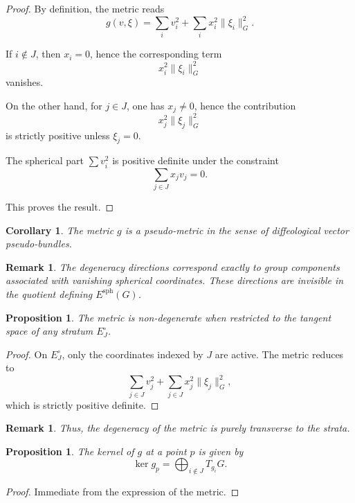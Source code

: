 \documentclass[11pt]{amsart}
\newtheorem{corollary}[theorem]{Corollary}
\newtheorem{proposition}[theorem]{Proposition}
\newtheorem{remark}[theorem]{Remark}
\begin{document}
\begin{proof}
By definition, the metric reads
\[
g(v,\xi)
=
\sum_i v_i^2
+
\sum_i x_i^2 \|\xi_i\|_G^2.
\]

If $i \notin J$, then $x_i = 0$, hence the corresponding term
\[
x_i^2 \|\xi_i\|_G^2
\]
vanishes.

On the other hand, for $j \in J$, one has $x_j \neq 0$, hence the contribution
\[
x_j^2 \|\xi_j\|_G^2
\]
is strictly positive unless $\xi_j = 0$.

The spherical part $\sum v_i^2$ is positive definite under the constraint
\[
\sum_{j\in J} x_j v_j = 0.
\]

This proves the result.
\end{proof}

\begin{corollary}
The metric $g$ is a pseudo-metric in the sense of diffeological vector pseudo-bundles.
\end{corollary}

\begin{remark}
The degeneracy directions correspond exactly to group components associated with vanishing spherical coordinates. These directions are invisible in the quotient defining $E^{\mathrm{sph}}(G)$.
\end{remark}

\begin{proposition}
The metric is non-degenerate when restricted to the tangent space of any stratum $E_J^\circ$.
\end{proposition}

\begin{proof}
On $E_J^\circ$, only the coordinates indexed by $J$ are active. The metric reduces to
\[
\sum_{j\in J} v_j^2
+
\sum_{j\in J} x_j^2 \|\xi_j\|_G^2,
\]
which is strictly positive definite.
\end{proof}

\begin{remark}
Thus, the degeneracy of the metric is purely transverse to the strata.
\end{remark}

\begin{proposition}
The kernel of $g$ at a point $p$ is given by
\[
\ker g_p
=
\bigoplus_{i\notin J} T_{g_i}G.
\]
\end{proposition}

\begin{proof}
Immediate from the expression of the metric.
\end{proof}
\end{document}

